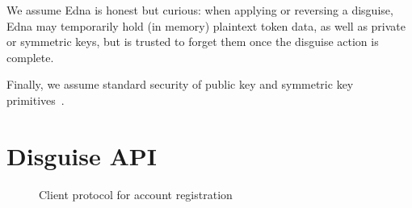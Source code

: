 We assume Edna is honest but curious: when applying or reversing a disguise, Edna may temporarily
hold (in memory) plaintext token data, as well as private or symmetric keys, but is trusted to
forget them once the disguise action is complete.  

Finally, we assume standard security of public key and
symmetric key primitives~.

\section{Disguise API}

\begin{figure*}
\caption{Client protocol for account registration}
\end{figure*}

